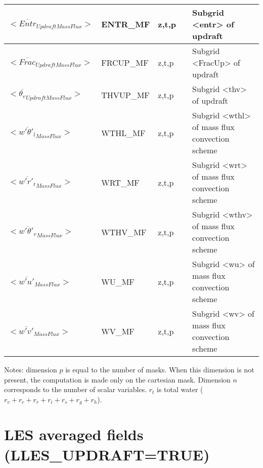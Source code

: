 \begin{longtable}[c]{|p{}|p{}|p{}|p{}|p{}|}
$<\overline{Entr}_{Updraft Mass Flux}>$      & ENTR\_MF  & z,t,p   &        & Subgrid <entr> of updraft \\\hline
$<\overline{Frac}_{Updraft Mass Flux}>$      & FRCUP\_MF & z,t,p   &        & Subgrid <FracUp> of updraft \\\hline
$<\overline{\theta_v}_{Updraft Mass Flux}>$  & THVUP\_MF & z,t,p   &        & Subgrid <thv> of updraft \\\hline
$<\overline{w'\theta'_l}_{Mass Flux}>$       & WTHL\_MF  & z,t,p   &        & Subgrid <wthl> of mass flux convection scheme \\\hline
$<\overline{w'r'_t}_{Mass Flux}>$            & WRT\_MF   & z,t,p   &        & Subgrid <wrt> of mass flux convection scheme \\\hline
$<\overline{w'\theta'_v}_{Mass Flux}>$       & WTHV\_MF  & z,t,p   &        & Subgrid <wthv> of mass flux convection scheme \\\hline
$<\overline{w'u'}_{Mass Flux}>$              & WU\_MF    & z,t,p   &        & Subgrid <wu> of mass flux convection scheme \\\hline
$<\overline{w'v'}_{Mass Flux}>$              & WV\_MF    & z,t,p   &        & Subgrid <wv> of mass flux convection scheme \\\hline
\end{longtable}

Notes: dimension $p$ is equal to the number of masks. When this dimension is not present, the computation is made only on the cartesian mask. Dimension $n$ corresponds to the number of scalar variables. $r_t$ is total water ($r_v+r_c+r_r+r_i+r_s+r_g+r_h$).


\section{LES averaged fields (LLES\_UPDRAFT=TRUE)}

